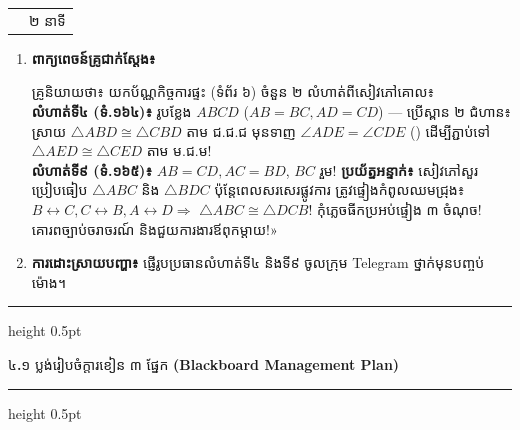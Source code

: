 \documentclass[a4paper,12pt]{article}
\makeatletter
\newcommand{\en}[1]{{\TimesEn #1}}
\newcommand{\enbf}[1]{{\TimesEn\textbf{#1}}}
\newcommand{\cnum}[1]{\text{\fontsize{10.5pt}{12pt}\selectfont\ding{\numexpr181+#1\relax}}}
\newcommand{\tri}[1]{\ensuremath{\triangle #1}}
\newcommand{\ang}[1]{\ensuremath{\angle #1}}
\newcommand{\cg}{\ensuremath{\cong}}
\newcommand{\subsectitle}[1]{{\muol\fontsize{11pt}{14.5pt}\selectfont #1}}
\newcommand{\subsec}[1]{%
  \needspace{1.6cm}%
  \vspace{4pt}%
  \subsectitle{#1}\par
  \vspace{2pt}\hrule height 0.5pt\vspace{3pt}%
}
\newenvironment{phasebox}[3]{%
  \needspace{2.2cm}%
  \begin{tcolorbox}[
    enhanced, sharp corners, colback=headgray, colframe=black,
    boxrule=1.0pt, top=3.5pt, bottom=3.5pt, left=9pt, right=9pt,
    before skip=6pt, after skip=3pt
  ]%
    \linespread{1.0}\selectfont\renewcommand{\arraystretch}{1.0}%
    \begin{tabular*}{\linewidth}{@{}>{\raggedright\arraybackslash}p{13.10cm}@{\extracolsep{\fill}}r@{}}
      {\muol\fontsize{11pt}{14.5pt}\selectfont #1} & {\fontsize{10.5pt}{13.5pt}\selectfont\en{#2 |} #3}%
    \end{tabular*}%
  \end{tcolorbox}%
  \begingroup\fontsize{11.5pt}{14.92pt}\selectfont
}{%
  \par\endgroup\vspace{3pt}\hrule height 0.5pt\vspace{4pt}%
}
\makeatother
\begin{document}
\begin{phasebox}{ជំហានទី ៥៖ កិច្ចការផ្ទះ \enbf{\#4, \#9} និងបណ្ដាំផ្ញើ}{48--50 min}{២ នាទី}
  \begin{enumerate}[leftmargin=0.45cm, topsep=1.5pt, itemsep=2.2pt, parsep=0pt]
    \item \textbf{ពាក្យពេចន៍គ្រូជាក់ស្ដែង៖}
      \begin{scriptbox}
        {\muol\fontsize{10.8pt}{14.5pt}\selectfont \enbf{«}គ្រូនិយាយថា៖} យកប័ណ្ណកិច្ចការផ្ទះ (ទំព័រ ៦) ចំនួន ២ លំហាត់ពីសៀវភៅគោល៖\\
        \textbf{លំហាត់ទី៤ (ទំ.១៦៤)៖} រូបខ្លែង $ABCD$ ($AB=BC, AD=CD$) — ប្រើស្ពាន ២ ជំហាន៖ ស្រាយ $\tri{ABD}\cg\tri{CBD}$ តាម \cnum{4} ជ.ជ.ជ មុនទាញ $\ang{ADE}=\ang{CDE}$ (\cnum{5}) ដើម្បីភ្ជាប់ទៅ $\tri{AED}\cg\tri{CED}$ តាម ម.ជ.ម!\\
        \textbf{លំហាត់ទី៩ (ទំ.១៦៥)៖} $AB=CD, AC=BD$, $BC$ រួម! \textbf{ប្រយ័ត្នអន្ទាក់៖} សៀវភៅសួរប្រៀបធៀប $\tri{ABC}$ និង $\tri{BDC}$ ប៉ុន្តែពេលសរសេរផ្លូវការ ត្រូវផ្ទៀងកំពូលឈមជ្រុង៖ $B\leftrightarrow C, C\leftrightarrow B, A\leftrightarrow D \Rightarrow$ \textbf{$\tri{ABC}\cg\tri{DCB}$}! កុំភ្លេចធីកប្រអប់ផ្ទៀង ៣ ចំណុច! គោរពច្បាប់ចរាចរណ៍ និងជួយការងារឪពុកម្ដាយ!»
      \end{scriptbox}
    \item \textbf{ការដោះស្រាយបញ្ហា៖} ផ្ញើរូបប្រធានលំហាត់ទី៤ និងទី៩ ចូលក្រុម \en{Telegram} ថ្នាក់មុនបញ្ចប់ម៉ោង។
  \end{enumerate}
\end{phasebox}

\subsec{៤\enbf{.}១ ប្លង់រៀបចំក្ដារខៀន ៣ ផ្នែក \enbf{(Blackboard Management Plan)}}
\end{document}
